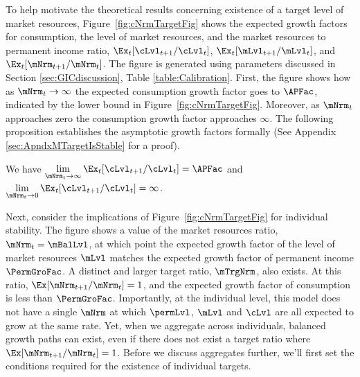 \documentclass[BufferStockTheory]{subfiles}
\begin{document}
\begin{comment}
Should we say normalized market resources above?
\end{comment}

To help motivate the theoretical results concerning existence of a target level of market resources, Figure~\ref{fig:cNrmTargetFig} shows the expected growth factors for consumption, the level of market resources, and the market resources to permanent income ratio, $\Ex_{t}[\cLvl_{t+1}/\cLvl_{t}]$, $\Ex_{t}[\mLvl_{t+1}/\mLvl_{t}]$, and $\Ex_{t}[\mNrm_{t+1}/\mNrm_{t}]$.
The figure is generated using parameters discussed in Section \ref{sec:GICdiscussion}, Table \ref{table:Calibration}.
First, the figure shows how as $\mNrm_{t} \rightarrow \infty$ the expected consumption growth factor goes to ${\APFac}$, indicated by the lower bound in Figure~\ref{fig:cNrmTargetFig}.
Moreover, as $\mNrm_{t}$ approaches zero the consumption growth factor approaches $\infty$.
The following proposition establishes the asymptotic growth factors formally (See Appendix \ref{sec:ApndxMTargetIsStable} for a proof).

\begin{proposition}\label{prop:convgGrowth}
We have $\lim\limits_{\mNrm_{t} \rightarrow \infty} \Ex_{t}[\cLvl_{t+1}/\cLvl_{t}] =  {\APFac}$ and $\lim\limits_{\mNrm_{t} \rightarrow  0} \Ex_{t}[\cLvl_{t+1}/\cLvl_{t}] =  \infty$. 
\end{proposition}

Next, consider the implications of Figure~\ref{fig:cNrmTargetFig} for individual stability.
The figure shows a value of the market resources ratio, $\mNrm_{t} = \mBalLvl$, at which point the expected growth factor of the level of market resources $\mLvl$ matches the expected growth factor of permanent income $\PermGroFac$.
A distinct and larger target ratio, $\mTrgNrm$, also exists.
At this ratio, $\Ex[\mNrm_{t+1}/\mNrm_{t}]=1$, and the expected growth factor of consumption is less than $\PermGroFac$.
Importantly, at the individual level, this model does not have a single $\mNrm$ at which $\permLvl$, $\mLvl$ and $\cLvl$ are all expected to grow at the same rate.
Yet, when we aggregate across individuals, balanced growth paths can exist, even if there does not exist a target ratio where $\Ex[\mNrm_{t+1}/\mNrm_{t}]=1$.
Before we discuss aggregates further, we'll first set the conditions required for the existence of individual targets.
\end{document}
